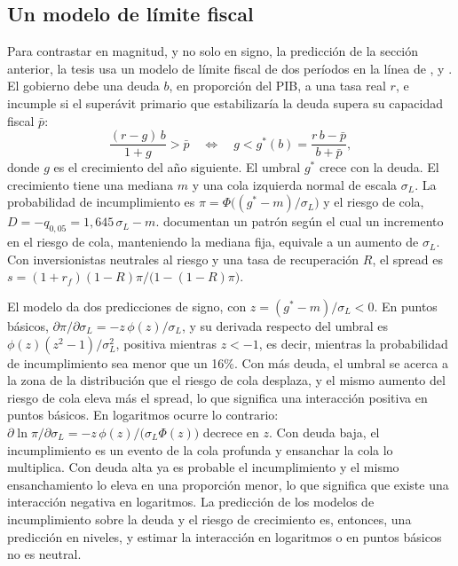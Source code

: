 \subsection{Un modelo de límite fiscal}
\label{sec:modelo-limite}

Para contrastar en magnitud, y no solo en signo, la predicción de la sección anterior, la tesis usa un modelo de límite fiscal de dos períodos en la línea de \citet{EatonGersovitz1981}, \citet{Bi2012} y \citet{GhoshEtAl2013}. El gobierno debe una deuda $b$, en proporción del PIB, a una tasa real $r$, e incumple si el superávit primario que estabilizaría la deuda supera su capacidad fiscal $\bar p$:
\begin{equation}
\frac{(r-g)\,b}{1+g}>\bar p \quad\Longleftrightarrow\quad g<g^*(b)=\frac{r\,b-\bar p}{b+\bar p},
\label{eq:limite}
\end{equation}
donde $g$ es el crecimiento del año siguiente. El umbral $g^*$ crece con la deuda. El crecimiento tiene una mediana $m$ y una cola izquierda normal de escala $\sigma_L$. La probabilidad de incumplimiento es $\pi=\Phi\big((g^*-m)/\sigma_L\big)$ y el riesgo de cola, $D=-q_{0,05}=1{,}645\,\sigma_L-m$. \citet{ABG2019b} documentan un patrón según el cual un incremento en el riesgo de cola, manteniendo la mediana fija, equivale a un aumento de $\sigma_L$. Con inversionistas neutrales al riesgo y una tasa de recuperación $R$, el spread es $s=(1+r_f)(1-R)\pi/\big(1-(1-R)\pi\big)$.

El modelo da dos predicciones de signo, con $z=(g^*-m)/\sigma_L<0$. En puntos básicos, $\partial\pi/\partial\sigma_L=-z\,\phi(z)/\sigma_L$, y su derivada respecto del umbral es $\phi(z)(z^2-1)/\sigma_L^2$, positiva mientras $z<-1$, es decir, mientras la probabilidad de incumplimiento sea menor que un 16\%. Con más deuda, el umbral se acerca a la zona de la distribución que el riesgo de cola desplaza, y el mismo aumento del riesgo de cola eleva más el spread, lo que significa una interacción positiva en puntos básicos. En logaritmos ocurre lo contrario: $\partial\ln\pi/\partial\sigma_L=-z\,\phi(z)/\big(\sigma_L\Phi(z)\big)$ decrece en $z$. Con deuda baja, el incumplimiento es un evento de la cola profunda y ensanchar la cola lo multiplica. Con deuda alta ya es probable el incumplimiento y el mismo ensanchamiento lo eleva en una proporción menor, lo que significa que existe una interacción negativa en logaritmos. La predicción de los modelos de incumplimiento sobre la deuda y el riesgo de crecimiento es, entonces, una predicción en niveles, y estimar la interacción en logaritmos o en puntos básicos no es neutral.

